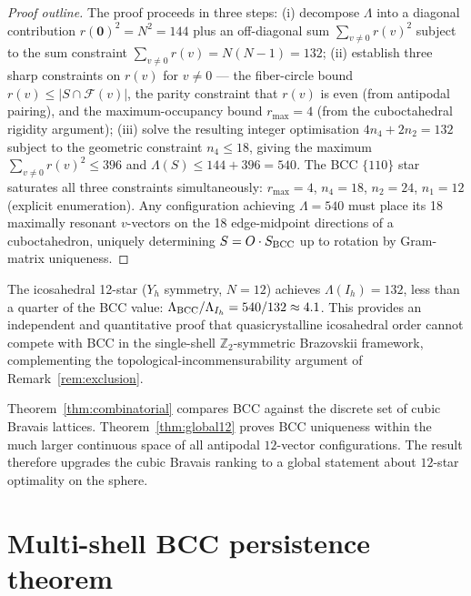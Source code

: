 \begin{proof}[Proof outline]
The proof proceeds in three steps: (i) decompose $\Lambda$ into a
diagonal contribution $r(\mathbf{0})^2 = N^2 = 144$ plus an
off-diagonal sum $\sum_{v \neq 0} r(v)^2$ subject to the sum
constraint $\sum_{v\neq 0} r(v) = N(N-1) = 132$; (ii) establish three
sharp constraints on $r(v)$ for $v \neq 0$ --- the fiber-circle bound
$r(v) \leq |S \cap \mathcal{F}(v)|$, the parity constraint that
$r(v)$ is even (from antipodal pairing), and the maximum-occupancy
bound $r_{\max} = 4$ (from the cuboctahedral rigidity argument);
(iii) solve the resulting integer optimisation
$4 n_4 + 2 n_2 = 132$ subject to the geometric constraint
$n_4 \leq 18$, giving the maximum $\sum_{v \neq 0} r(v)^2 \leq 396$
and $\Lambda(S) \leq 144 + 396 = 540$. The BCC $\{110\}$ star
saturates all three constraints simultaneously: $r_{\max} = 4$,
$n_4 = 18$, $n_2 = 24$, $n_1 = 12$ (explicit enumeration). Any
configuration achieving $\Lambda = 540$ must place its 18 maximally
resonant $v$-vectors on the 18 edge-midpoint directions of a
cuboctahedron, uniquely determining $S = O \cdot S_{\rm BCC}$ up to
rotation by Gram-matrix uniqueness.
\end{proof}

\begin{remark}
\label{rem:icosahedral}
The icosahedral 12-star ($Y_h$ symmetry, $N = 12$) achieves
$\Lambda(I_h) = 132$, less than a quarter of the BCC value:
$\Lambda_{\rm BCC} / \Lambda_{I_h} = 540/132 \approx 4.1$. This
provides an independent and quantitative proof that
quasicrystalline icosahedral order cannot compete with BCC in the
single-shell $\mathbb{Z}_2$-symmetric Brazovskii framework,
complementing the topological-incommensurability argument of
Remark~\ref{rem:exclusion}.
\end{remark}

\begin{remark}
Theorem~\ref{thm:combinatorial} compares BCC against the discrete set
of cubic Bravais lattices. Theorem~\ref{thm:global12} proves BCC
uniqueness within the much larger continuous space of all antipodal
$12$-vector configurations. The result therefore upgrades the cubic
Bravais ranking to a global statement about $12$-star optimality on
the sphere.
\end{remark}

\section{Multi-shell BCC persistence
theorem}\label{sec:multishell}

